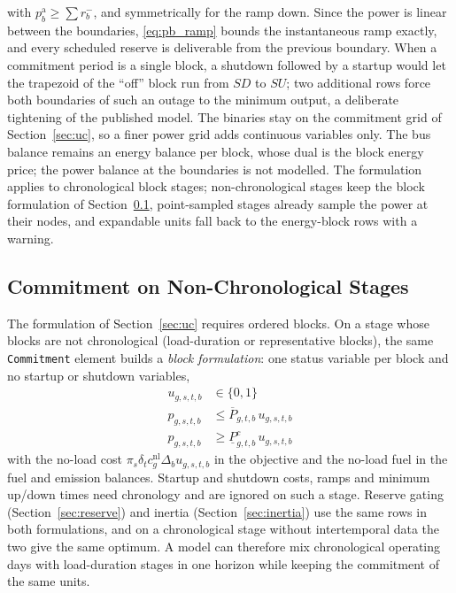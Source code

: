 with $p^\text{a}_b \geq \sum r^{-}_b$, and symmetrically for the ramp
down.  Since the power is linear between
the boundaries, \eqref{eq:pb_ramp} bounds the instantaneous ramp
exactly, and every scheduled reserve is deliverable from the previous
boundary.  When a commitment period is a single block, a shutdown
followed by a startup would let the trapezoid of the ``off'' block run
from $SD$ to $SU$; two additional rows force both boundaries of such an
outage to the minimum output, a deliberate tightening of the published
model.  The binaries stay on the commitment grid of
Section~\ref{sec:uc}, so a finer power grid adds continuous variables
only.  The bus balance remains an energy balance per block, whose dual
is the block energy price; the power balance at the boundaries is not
modelled.  The formulation applies to chronological block stages;
non-chronological stages keep the block formulation of
Section~\ref{sec:sc}, point-sampled stages already sample the power at
their nodes, and expandable units fall back to the energy-block rows
with a warning.

\subsection{Commitment on Non-Chronological Stages}
\label{sec:sc}

The formulation of Section~\ref{sec:uc} requires ordered blocks.  On a
stage whose blocks are not chronological (load-duration or
representative blocks), the same \texttt{Commitment} element builds a
\emph{block formulation}: one status variable per block and no
startup or shutdown variables,
\begin{align}
u_{g,s,t,b} &\in \{0,1\}
\label{eq:sc_var} \\
p_{g,s,t,b} &\leq \overline{P}_{g,t,b}\,u_{g,s,t,b}
  \label{eq:sc_upper} \\
p_{g,s,t,b} &\geq \underline{P}^{c}_{g,t,b}\,u_{g,s,t,b}
  \label{eq:sc_lower}
\end{align}
with the no-load cost $\pi_s \delta_t c^\text{nl}_g \Delta_b
u_{g,s,t,b}$ in the objective and the no-load fuel in the fuel and
emission balances.  Startup and shutdown costs, ramps and minimum
up/down times need chronology and are ignored on such a stage.  Reserve
gating (Section~\ref{sec:reserve}) and inertia
(Section~\ref{sec:inertia}) use the same rows in both formulations, and
on a chronological stage without intertemporal data the two give the
same optimum.  A model can therefore mix chronological operating days
with load-duration stages in one horizon while keeping the commitment
of the same units.

